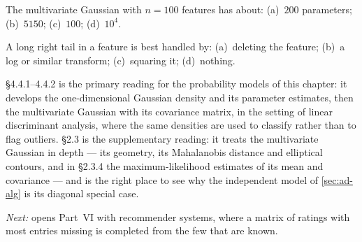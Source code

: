 \qz The multivariate Gaussian with $n = 100$ features has about: (a)~$200$
parameters; (b)~$5150$; (c)~$100$; (d)~$10^4$.

\qz A long right tail in a feature is best handled by: (a)~deleting the feature;
(b)~a log or similar transform; (c)~squaring it; (d)~nothing.

\furtherreading

\textcite{james2021} §4.4.1--4.4.2 is the primary reading for the probability
models of this chapter: it develops the one-dimensional Gaussian density and its
parameter estimates, then the multivariate Gaussian with its covariance matrix,
in the setting of linear discriminant analysis, where the same densities are used
to classify rather than to flag outliers. \textcite{bishop2006} §2.3 is the
supplementary reading: it treats the multivariate Gaussian in depth --- its
geometry, its Mahalanobis distance and elliptical contours, and in §2.3.4 the
maximum-likelihood estimates of its mean and covariance --- and is the right place
to see why the independent model of \cref{sec:ad-alg} is its diagonal special
case.

\bigskip
\noindent\emph{Next:}  opens Part~VI with recommender systems,
where a matrix of ratings with most entries missing is completed from the few
that are known.
